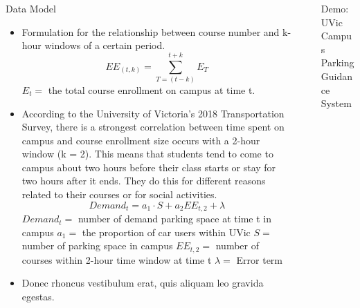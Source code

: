 \documentclass[final, xcolor={table,dvipsnames},t]{beamer}
\newlength{\sepwidth}
\newlength{\colwidth}
\newcommand{\separatorcolumn}{\begin{column}{\sepwidth}\end{column}}
\begin{document}
\begin{frame}[t]
\begin{columns}[t]
\begin{column}{\colwidth}
\begin{block}{Data Model}
\begin{itemize}
        \begin{itemize}
          \item Formulation for the relationship between course number and k-hour windows of a certain period.
        $$ EE_{(t,k)} = \sum_{T=(t-k)}^{t+k} E_T $$
        $ E_t = $ the total course enrollment on campus at time t.
          \item According to the University of Victoria's 2018 Transportation Survey, there is a strongest correlation between time spent on campus and course enrollment size occurs with a 2-hour window (k = 2). This means that students tend to come to campus about two hours before their class starts or stay for two hours after it ends. They do this for different reasons related to their courses or for social activities.
        $$Demand_t = a_1\cdot S + a_2 EE_{t,2} + \lambda$$
        $Demand_t =$ number of demand parking space at time t in campus
        $a_1 =$ the proportion of car users within UVic
        $S =$ number of parking space in campus
        $EE_{t,2} =$ number of courses within 2-hour time window at time t
        $\lambda =$ Error term
          \item Donec rhoncus vestibulum erat, quis aliquam leo
            gravida egestas.
        \end{itemize}
      
    \end{itemize}





  \end{block}

\end{column}

\separatorcolumn

\begin{column}{\colwidth}

  \begin{exampleblock}{Demo: UVic Campus Parking Guidance System}


\end{exampleblock}
\end{column}
\end{columns}
\end{frame}
\end{document}
